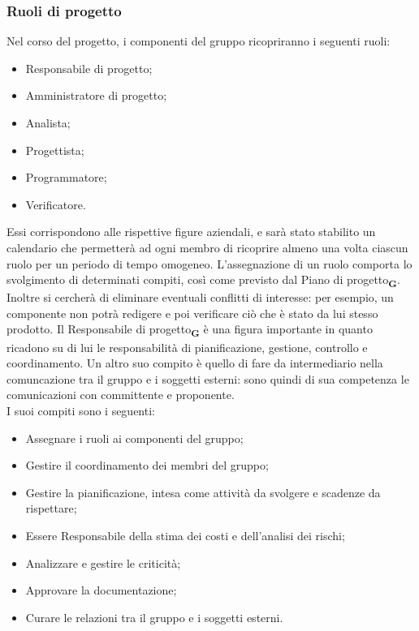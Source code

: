 \subsubsection{Ruoli di progetto}
Nel corso del progetto, i componenti del gruppo ricopriranno i seguenti ruoli:
\begin {itemize}
    \item Responsabile di progetto;
    \item Amministratore di progetto;
    \item Analista;
    \item Progettista;
    \item Programmatore;
    \item Verificatore.
\end {itemize}
Essi corrispondono alle rispettive figure aziendali, e sarà stato stabilito un calendario che permetterà ad ogni membro di ricoprire almeno una volta ciascun ruolo per un periodo di tempo omogeneo. L’assegnazione di un ruolo comporta lo svolgimento di determinati compiti, così come previsto dal Piano di progetto\textsubscript{\textbf{G}}. Inoltre si cercherà di eliminare eventuali conflitti di interesse: per esempio, un componente non potrà redigere e poi verificare ciò che è stato da lui stesso prodotto.
Il Responsabile di progetto\textsubscript{\textbf{G}} è una figura importante in quanto ricadono su di lui le responsabilità di pianificazione, gestione, controllo e coordinamento. Un altro suo compito è quello di fare da intermediario nella comuncazione tra il gruppo e i soggetti esterni: sono quindi di sua competenza le comunicazioni con committente e proponente.\\
I suoi compiti sono i seguenti:
\begin {itemize}
    \item Assegnare i ruoli ai componenti del gruppo;
    \item Gestire il coordinamento dei membri del gruppo;
    \item Gestire la pianificazione, intesa come attività da svolgere e scadenze da rispettare;
    \item Essere Responsabile della stima dei costi e dell’analisi dei rischi;
    \item Analizzare e gestire le criticità;
    \item Approvare la documentazione;
    \item Curare le relazioni tra il gruppo e i soggetti esterni.
\end {itemize}
